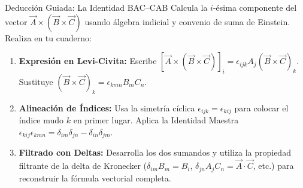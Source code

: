 \documentclass[10pt,aspectratio=169]{beamer}
\begin{document}
\begin{frame}{Deducción Guiada: La Identidad BAC--CAB}
  \vspace{0.05cm}
  Calcula la $i$-ésima componente del vector $\vec{A} \times (\vec{B} \times \vec{C})$ usando álgebra indicial y convenio de suma de Einstein. Realiza en tu cuaderno:
  \vspace{0.22cm}
  \begin{enumerate}\itemsep10pt
    \item[(a)] \textbf{Expresión en Levi-Civita:} Escribe $[\vec{A} \times (\vec{B} \times \vec{C})]_i = \epsilon_{ijk} A_j (\vec{B}\times\vec{C})_k$. Sustituye $(\vec{B}\times\vec{C})_k = \epsilon_{kmn} B_m C_n$.
    \item[(b)] \textbf{Alineación de Índices:} Usa la simetría cíclica $\epsilon_{ijk} = \epsilon_{kij}$ para colocar el índice mudo $k$ en primer lugar. Aplica la Identidad Maestra $\epsilon_{kij}\epsilon_{kmn} = \delta_{im}\delta_{jn} - \delta_{in}\delta_{jm}$.
    \item[(c)] \textbf{Filtrado con Deltas:} Desarrolla los dos sumandos y utiliza la propiedad filtrante de la delta de Kronecker ($\delta_{im}B_m = B_i$, $\delta_{jn}A_j C_n = \vec{A}\cdot\vec{C}$, etc.) para reconstruir la fórmula vectorial completa.
  \end{enumerate}
\end{frame}
\end{document}
